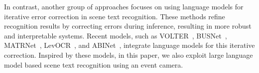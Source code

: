 In contrast, another group of approaches focuses on using language models for iterative error correction in scene text recognition. These methods refine recognition results by correcting errors during inference, resulting in more robust and interpretable systems. Recent models, such as VOLTER~\cite{li2024volter}, BUSNet~\cite{Wei2024BUSNet}, MATRNet~\cite{na2022matrn}, LevOCR~\cite{da2022levocr}, and ABINet~\cite{fang2021ABINet}, integrate language models for this iterative correction. 
Inspired by these models, in this paper, we also exploit large language model based scene text recognition using an event camera. 




